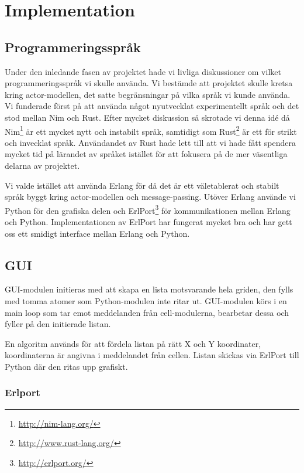 \chapter{Implementation}

\label{ch:Implementation} 


\section{Programmeringsspråk}

Under den inledande fasen av projektet hade vi livliga diskussioner om vilket programmeringsspråk vi skulle använda. Vi bestämde att projektet skulle kretsa kring actor-modellen, det satte begränsningar på vilka språk vi kunde använda. Vi funderade först på att använda något nyutvecklat experimentellt språk och det stod mellan Nim och Rust. Efter mycket diskussion så skrotade vi denna idé då Nim\footnote{\url{http://nim-lang.org/}} är ett mycket nytt och instabilt språk, samtidigt som Rust\footnote{\url{http://www.rust-lang.org/}} är ett för strikt och invecklat språk. Användandet av Rust hade lett till att vi hade fått spendera mycket tid på lärandet av språket istället för att fokusera på de mer väsentliga delarna av projektet. 

Vi valde istället att använda Erlang för då det är ett väletablerat och stabilt språk byggt kring actor-modellen och message-passing. Utöver Erlang använde vi Python för den grafiska delen och ErlPort\footnote{\url{http://erlport.org/}} för kommunikationen mellan Erlang och Python. Implementationen av ErlPort har fungerat mycket bra och har gett oss ett smidigt interface mellan Erlang och Python.

\section{GUI}

GUI-modulen initieras med att skapa en lista motsvarande hela griden, den fylls med tomma atomer som Python-modulen inte ritar ut. GUI-modulen körs i en main loop som tar emot meddelanden från cell-modulerna, bearbetar dessa och fyller på den initierade listan. 

En algoritm används för att fördela listan på rätt X och Y koordinater, koordinaterna är angivna i meddelandet från cellen. Listan skickas via ErlPort till Python där den ritas upp grafiskt.

\subsection{Erlport}

